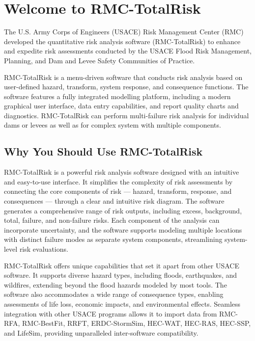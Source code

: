 \documentclass[
]{book}
\begin{document}
\hypertarget{welcome}{%
\chapter{Welcome to RMC-TotalRisk}\label{welcome}}

The U.S. Army Corps of Engineers (USACE) Risk Management Center (RMC) developed the quantitative risk analysis software (RMC-TotalRisk) to enhance and expedite risk assessments conducted by the USACE Flood Risk Management, Planning, and Dam and Levee Safety Communities of Practice.

RMC-TotalRisk is a menu-driven software that conducts risk analysis based on user-defined hazard, transform, system response, and consequence functions. The software features a fully integrated modelling platform, including a modern graphical user interface, data entry capabilities, and report quality charts and diagnostics. RMC-TotalRisk can perform multi-failure risk analysis for individual dams or levees as well as for complex system with multiple components.

\hypertarget{why-you-should-use-rmc-totalrisk}{%
\section{Why You Should Use RMC-TotalRisk}\label{why-you-should-use-rmc-totalrisk}}

RMC-TotalRisk is a powerful risk analysis software designed with an intuitive and easy-to-use interface. It simplifies the complexity of risk assessments by connecting the core components of risk --- hazard, transform, response, and consequences --- through a clear and intuitive risk diagram. The software generates a comprehensive range of risk outputs, including excess, background, total, failure, and non-failure risks. Each component of the analysis can incorporate uncertainty, and the software supports modeling multiple locations with distinct failure modes as separate system components, streamlining system-level risk evaluations.

RMC-TotalRisk offers unique capabilities that set it apart from other USACE software. It supports diverse hazard types, including floods, earthquakes, and wildfires, extending beyond the flood hazards modeled by most tools. The software also accommodates a wide range of consequence types, enabling assessments of life loss, economic impacts, and environmental effects. Seamless integration with other USACE programs allows it to import data from RMC-RFA, RMC-BestFit, RRFT, ERDC-StormSim, HEC-WAT, HEC-RAS, HEC-SSP, and LifeSim, providing unparalleled inter-software compatibility.
\end{document}
